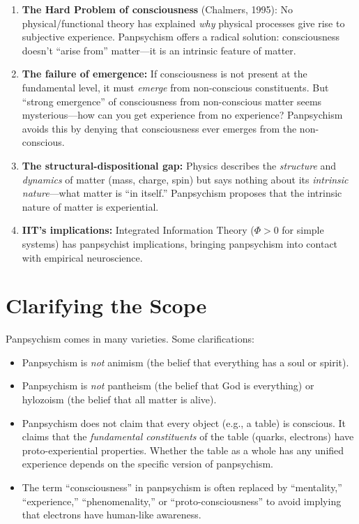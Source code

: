 \documentclass[11pt,a4paper]{report}
\begin{document}
\begin{enumerate}[leftmargin=2em]
  \item \textbf{The Hard Problem of consciousness} (Chalmers, 1995): No physical/functional theory has explained \emph{why} physical processes give rise to subjective experience. Panpsychism offers a radical solution: consciousness doesn't ``arise from'' matter---it is an intrinsic feature of matter.
  \item \textbf{The failure of emergence:} If consciousness is not present at the fundamental level, it must \emph{emerge} from non-conscious constituents. But ``strong emergence'' of consciousness from non-conscious matter seems mysterious---how can you get experience from no experience? Panpsychism avoids this by denying that consciousness ever emerges from the non-conscious.
  \item \textbf{The structural-dispositional gap:} Physics describes the \emph{structure} and \emph{dynamics} of matter (mass, charge, spin) but says nothing about its \emph{intrinsic nature}---what matter is ``in itself.'' Panpsychism proposes that the intrinsic nature of matter is experiential.
  \item \textbf{IIT's implications:} Integrated Information Theory ($\Phi > 0$ for simple systems) has panpsychist implications, bringing panpsychism into contact with empirical neuroscience.
\end{enumerate}

\section{Clarifying the Scope}

Panpsychism comes in many varieties. Some clarifications:

\begin{itemize}[leftmargin=1.5em]
  \item Panpsychism is \emph{not} animism (the belief that everything has a soul or spirit).
  \item Panpsychism is \emph{not} pantheism (the belief that God is everything) or hylozoism (the belief that all matter is alive).
  \item Panpsychism does not claim that every object (e.g., a table) is conscious. It claims that the \emph{fundamental constituents} of the table (quarks, electrons) have proto-experiential properties. Whether the table as a whole has any unified experience depends on the specific version of panpsychism.
  \item The term ``consciousness'' in panpsychism is often replaced by ``mentality,'' ``experience,'' ``phenomenality,'' or ``proto-consciousness'' to avoid implying that electrons have human-like awareness.
\end{itemize}
\end{document}
